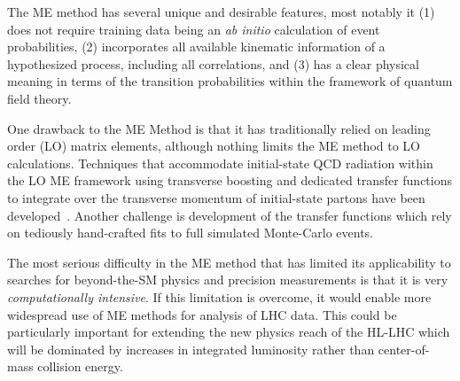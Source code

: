 
The ME method has several unique and desirable features, most notably it (1) does not require training data being an \emph{ab initio} calculation of event probabilities, (2) incorporates all available kinematic information of a hypothesized process, including all correlations, and (3) has a clear physical meaning in terms of the transition probabilities within the framework of quantum field theory.

One drawback to the ME Method is that it has traditionally relied on leading order (LO) matrix elements, although nothing limits the ME method to LO calculations. Techniques that accommodate initial-state QCD radiation within the LO ME framework using transverse boosting and dedicated transfer functions to integrate over the transverse momentum of initial-state partons have been developed~\cite{Alwall:2010cq}.
Another challenge is development of the transfer functions which rely on tediously hand-crafted fits to full simulated Monte-Carlo events.

The most serious difficulty in the ME method that has limited its applicability to searches for beyond-the-SM physics and precision measurements is that it is very \emph{computationally intensive}. If this limitation is overcome, it would enable more widespread use of ME methods for analysis of LHC data. This could be particularly important for extending the new physics reach of the HL-LHC which will be dominated by increases in integrated luminosity rather than center-of-mass collision energy.

